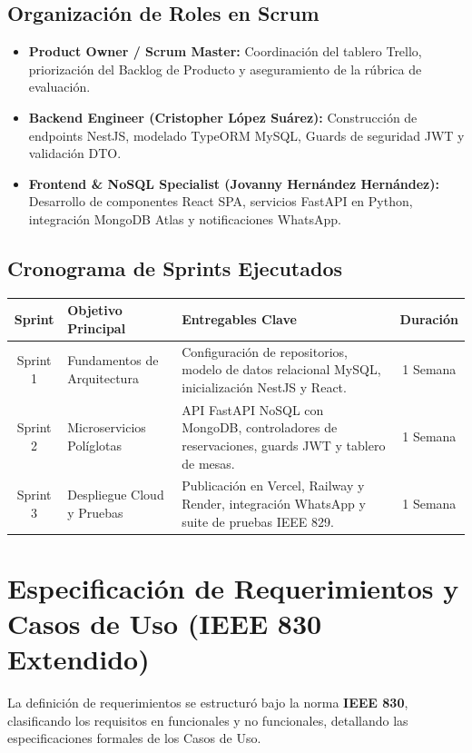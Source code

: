 \documentclass[12pt,a4paper]{article}
\begin{document}
\subsection{Organización de Roles en Scrum}
\begin{itemize}[leftmargin=*]
  \item \textbf{Product Owner / Scrum Master:} Coordinación del tablero Trello, priorización del Backlog de Producto y aseguramiento de la rúbrica de evaluación.
  \item \textbf{Backend Engineer (Cristopher López Suárez):} Construcción de endpoints NestJS, modelado TypeORM MySQL, Guards de seguridad JWT y validación DTO.
  \item \textbf{Frontend \& NoSQL Specialist (Jovanny Hernández Hernández):} Desarrollo de componentes React SPA, servicios FastAPI en Python, integración MongoDB Atlas y notificaciones WhatsApp.
\end{itemize}

\subsection{Cronograma de Sprints Ejecutados}
\begin{center}\small
\begin{tabular}{|c|p{4.5cm}|p{5.5cm}|c|}
\hline
\textbf{Sprint} & \textbf{Objetivo Principal} & \textbf{Entregables Clave} & \textbf{Duración} \\ \hline
Sprint 1 & Fundamentos de Arquitectura & Configuración de repositorios, modelo de datos relacional MySQL, inicialización NestJS y React. & 1 Semana \\ \hline
Sprint 2 & Microservicios Políglotas & API FastAPI NoSQL con MongoDB, controladores de reservaciones, guards JWT y tablero de mesas. & 1 Semana \\ \hline
Sprint 3 & Despliegue Cloud y Pruebas & Publicación en Vercel, Railway y Render, integración WhatsApp y suite de pruebas IEEE 829. & 1 Semana \\ \hline
\end{tabular}
\end{center}

\section{Especificación de Requerimientos y Casos de Uso (IEEE 830 Extendido)}
La definición de requerimientos se estructuró bajo la norma \textbf{IEEE 830}, clasificando los requisitos en funcionales y no funcionales, detallando las especificaciones formales de los Casos de Uso.
\end{document}
